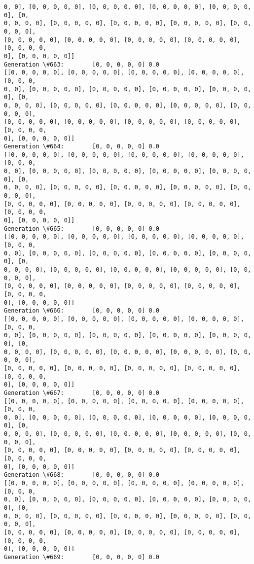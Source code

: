 \documentclass[11pt]{article}
\begin{document}
\begin{Verbatim}[commandchars=\\\{\}]
0, 0], [0, 0, 0, 0, 0], [0, 0, 0, 0, 0], [0, 0, 0, 0, 0], [0, 0, 0, 0, 0], [0,
0, 0, 0, 0], [0, 0, 0, 0, 0], [0, 0, 0, 0, 0], [0, 0, 0, 0, 0], [0, 0, 0, 0, 0],
[0, 0, 0, 0, 0], [0, 0, 0, 0, 0], [0, 0, 0, 0, 0], [0, 0, 0, 0, 0], [0, 0, 0, 0,
0], [0, 0, 0, 0, 0]]
Generation \#663:        [0, 0, 0, 0, 0] 0.0
[[0, 0, 0, 0, 0], [0, 0, 0, 0, 0], [0, 0, 0, 0, 0], [0, 0, 0, 0, 0], [0, 0, 0,
0, 0], [0, 0, 0, 0, 0], [0, 0, 0, 0, 0], [0, 0, 0, 0, 0], [0, 0, 0, 0, 0], [0,
0, 0, 0, 0], [0, 0, 0, 0, 0], [0, 0, 0, 0, 0], [0, 0, 0, 0, 0], [0, 0, 0, 0, 0],
[0, 0, 0, 0, 0], [0, 0, 0, 0, 0], [0, 0, 0, 0, 0], [0, 0, 0, 0, 0], [0, 0, 0, 0,
0], [0, 0, 0, 0, 0]]
Generation \#664:        [0, 0, 0, 0, 0] 0.0
[[0, 0, 0, 0, 0], [0, 0, 0, 0, 0], [0, 0, 0, 0, 0], [0, 0, 0, 0, 0], [0, 0, 0,
0, 0], [0, 0, 0, 0, 0], [0, 0, 0, 0, 0], [0, 0, 0, 0, 0], [0, 0, 0, 0, 0], [0,
0, 0, 0, 0], [0, 0, 0, 0, 0], [0, 0, 0, 0, 0], [0, 0, 0, 0, 0], [0, 0, 0, 0, 0],
[0, 0, 0, 0, 0], [0, 0, 0, 0, 0], [0, 0, 0, 0, 0], [0, 0, 0, 0, 0], [0, 0, 0, 0,
0], [0, 0, 0, 0, 0]]
Generation \#665:        [0, 0, 0, 0, 0] 0.0
[[0, 0, 0, 0, 0], [0, 0, 0, 0, 0], [0, 0, 0, 0, 0], [0, 0, 0, 0, 0], [0, 0, 0,
0, 0], [0, 0, 0, 0, 0], [0, 0, 0, 0, 0], [0, 0, 0, 0, 0], [0, 0, 0, 0, 0], [0,
0, 0, 0, 0], [0, 0, 0, 0, 0], [0, 0, 0, 0, 0], [0, 0, 0, 0, 0], [0, 0, 0, 0, 0],
[0, 0, 0, 0, 0], [0, 0, 0, 0, 0], [0, 0, 0, 0, 0], [0, 0, 0, 0, 0], [0, 0, 0, 0,
0], [0, 0, 0, 0, 0]]
Generation \#666:        [0, 0, 0, 0, 0] 0.0
[[0, 0, 0, 0, 0], [0, 0, 0, 0, 0], [0, 0, 0, 0, 0], [0, 0, 0, 0, 0], [0, 0, 0,
0, 0], [0, 0, 0, 0, 0], [0, 0, 0, 0, 0], [0, 0, 0, 0, 0], [0, 0, 0, 0, 0], [0,
0, 0, 0, 0], [0, 0, 0, 0, 0], [0, 0, 0, 0, 0], [0, 0, 0, 0, 0], [0, 0, 0, 0, 0],
[0, 0, 0, 0, 0], [0, 0, 0, 0, 0], [0, 0, 0, 0, 0], [0, 0, 0, 0, 0], [0, 0, 0, 0,
0], [0, 0, 0, 0, 0]]
Generation \#667:        [0, 0, 0, 0, 0] 0.0
[[0, 0, 0, 0, 0], [0, 0, 0, 0, 0], [0, 0, 0, 0, 0], [0, 0, 0, 0, 0], [0, 0, 0,
0, 0], [0, 0, 0, 0, 0], [0, 0, 0, 0, 0], [0, 0, 0, 0, 0], [0, 0, 0, 0, 0], [0,
0, 0, 0, 0], [0, 0, 0, 0, 0], [0, 0, 0, 0, 0], [0, 0, 0, 0, 0], [0, 0, 0, 0, 0],
[0, 0, 0, 0, 0], [0, 0, 0, 0, 0], [0, 0, 0, 0, 0], [0, 0, 0, 0, 0], [0, 0, 0, 0,
0], [0, 0, 0, 0, 0]]
Generation \#668:        [0, 0, 0, 0, 0] 0.0
[[0, 0, 0, 0, 0], [0, 0, 0, 0, 0], [0, 0, 0, 0, 0], [0, 0, 0, 0, 0], [0, 0, 0,
0, 0], [0, 0, 0, 0, 0], [0, 0, 0, 0, 0], [0, 0, 0, 0, 0], [0, 0, 0, 0, 0], [0,
0, 0, 0, 0], [0, 0, 0, 0, 0], [0, 0, 0, 0, 0], [0, 0, 0, 0, 0], [0, 0, 0, 0, 0],
[0, 0, 0, 0, 0], [0, 0, 0, 0, 0], [0, 0, 0, 0, 0], [0, 0, 0, 0, 0], [0, 0, 0, 0,
0], [0, 0, 0, 0, 0]]
Generation \#669:        [0, 0, 0, 0, 0] 0.0

\end{Verbatim}
\end{document}
